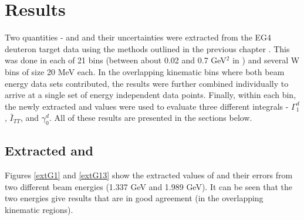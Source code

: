 \clearpage
%
\chapter{Results}
\label{cha:results}





Two quantities - \gone and \afone and their uncertainties were extracted from the EG4 deuteron target data  
using the methods outlined in %
the previous chapter%
. This was done in each of 21 \qsqs bins (between about 0.02 and 0.7 GeV$^2$ in \qsq) %
and several W bins of size 20 MeV each. In the overlapping kinematic bins where both beam energy data sets 
contributed, the results were further combined individually to arrive at a single set of energy independent 
data points. Finally, within each \qsqs bin, the newly extracted \gones and \afones values were used to evaluate 
three different integrals - $\Gamma^d_1$, $\bar{I}_{TT}$, and $\gamma^d_0$. All of these results are presented
in the sections below.


\section{Extracted \gones and \afone}
Figures \ref{extG1} and \ref{extG13} show the extracted values of \gones and their errors from two different beam energies (1.337 GeV and 1.989 GeV).%
It can be seen that the two energies give results that are in good agreement (in the overlapping kinematic regions).

